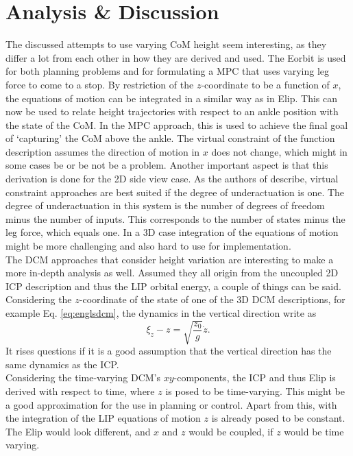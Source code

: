 \section{Analysis \& Discussion}
The discussed attempts to use varying \ac{CoM} height seem interesting, as they differ a lot from each other in how they are derived and used. The \ac{Eorbit} is used for both planning problems and for formulating a \ac{MPC} that uses varying leg force to come to a stop. By restriction of the $z$-coordinate to be a function of $x$, the equations of motion can be integrated in a similar way as in \ac{Elip}. This can now be used to relate height trajectories with respect to an ankle position with the state of the \ac{CoM}. In the \ac{MPC} approach, this is used to achieve the final goal of `capturing' the \ac{CoM} above the ankle. The virtual constraint of the function description assumes the direction of motion in $x$ does not change, which might in some cases be or be not be a problem. Another important aspect is that this derivation is done for the \ac{2D} side view case. As the authors of \cite{koolen2016balance} describe, virtual constraint approaches are best suited if the degree of underactuation is one. The degree of underactuation in this system is the number of degrees of freedom minus the number of inputs. This corresponds to the number of states minus the leg force, which equals one. In a \ac{3D} case integration of the equations of motion might be more challenging and also hard to use for implementation. \\
The \ac{DCM} approaches that consider height variation are interesting to make a more in-depth analysis as well. Assumed they all origin from the uncoupled \ac{2D} \ac{ICP} description and thus the \ac{LIP} orbital energy, a couple of things can be said. Considering the $z$-coordinate of the state of one of the \ac{3D} \ac{DCM} descriptions, for example Eq. \eqref{eq:englsdcm}, the dynamics in the vertical direction write as
\begin{equation}
\xi_z - z= \sqrt{\frac{z_0}{g}}\dot{z}.
\end{equation}
It rises questions if it is a good assumption that the vertical direction has the same dynamics as the \ac{ICP}. \\
Considering the time-varying \ac{DCM}'s $xy$-components, the \ac{ICP} and thus \ac{Elip} is derived with respect to time, where $z$ is posed to be time-varying. This might be a good approximation for the use in planning or control. Apart from this, with the integration of the \ac{LIP} equations of motion $z$ is already posed to be constant. The \ac{Elip} would look different, and $x$ and $z$ would be coupled, if $z$ would be time varying. 

